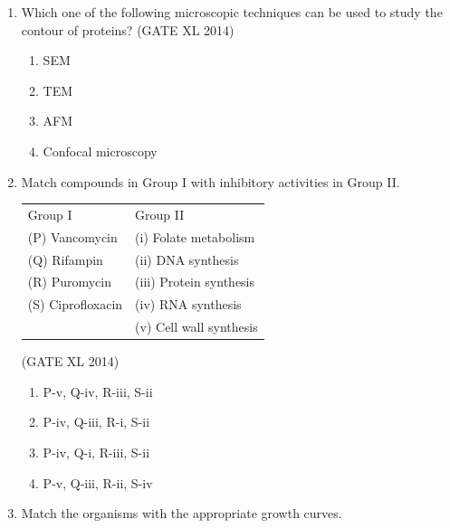 \documentclass[journal,12pt,onecolumn]{IEEEtran}
\theoremstyle{remark}
\begin{document}
\begin{enumerate}
\item Which one of the following microscopic techniques can be used to study the contour of proteins? \hfill(GATE XL 2014)
\begin{multicols}{2}
\begin{enumerate}
\item SEM
\item TEM
\item AFM
\item Confocal microscopy
\end{enumerate}
\end{multicols}

    \item Match compounds in Group I with inhibitory activities in Group II.  

    \begin{tabular}{ll}
    Group I & Group II \\
    (P) Vancomycin & (i) Folate metabolism \\
    (Q) Rifampin & (ii) DNA synthesis \\
    (R) Puromycin & (iii) Protein synthesis \\
    (S) Ciprofloxacin & (iv) RNA synthesis \\
                      & (v) Cell wall synthesis \\
    \end{tabular}
    \hfill (GATE XL 2014)
    \begin{multicols}{2}
    \begin{enumerate}
        \item P-v, Q-iv, R-iii, S-ii  
        \item P-iv, Q-iii, R-i, S-ii  
        \item P-iv, Q-i, R-iii, S-ii  
        \item P-v, Q-iii, R-ii, S-iv  
    \end{enumerate}
    \end{multicols}


    \item Match the organisms with the appropriate growth curves.  


\end{enumerate}
\end{document}
